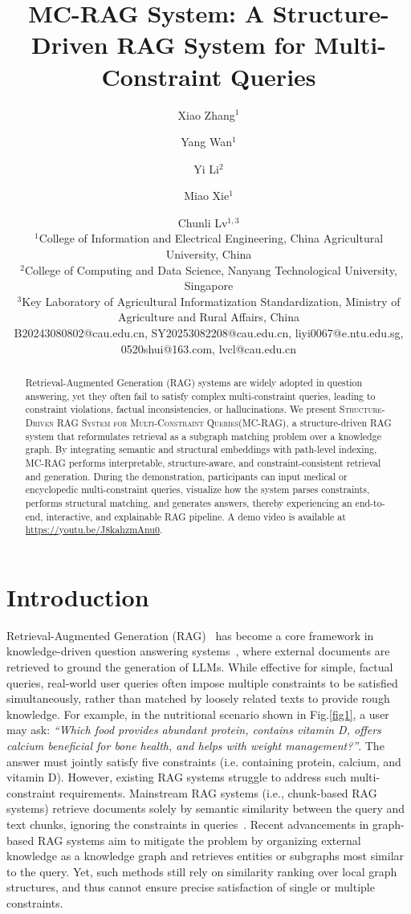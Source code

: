 \documentclass{article}
\title{MC-RAG System: A Structure-Driven RAG System for Multi-Constraint Queries}
\author{
  Xiao Zhang$^1$
  \and
  Yang Wan$^1$
  \and
  Yi Li$^2$
  \and
  Miao Xie$^1$
  \and
  Chunli Lv$^{1,3}$\\
  \affiliations
  $^1$College of Information and Electrical Engineering, China Agricultural University, China\\
  $^2$College of Computing and Data Science, Nanyang Technological University, Singapore\\
  $^3$Key Laboratory of Agricultural Informatization Standardization, Ministry of Agriculture and Rural Affairs, China\\
  \emails
  B20243080802@cau.edu.cn,
  SY20253082208@cau.edu.cn,
  liyi0067@e.ntu.edu.sg,
  0520shui@163.com,
  lvcl@cau.edu.cn
}
\begin{document}
\maketitle

\begin{abstract}
Retrieval-Augmented Generation (RAG) systems are widely adopted in question answering, yet they often fail to satisfy complex multi-constraint queries, leading to constraint violations, factual inconsistencies, or hallucinations.
We present \textsc{ Structure-Driven RAG System for Multi-Constraint Queries(MC-RAG)}, 
a structure-driven RAG system that reformulates retrieval as a subgraph matching problem over a knowledge graph. By integrating semantic and structural embeddings with path-level indexing, \textsc{MC-RAG} performs interpretable, structure-aware, and constraint-consistent retrieval and generation. 
During the demonstration, participants can input medical or encyclopedic multi-constraint queries, visualize how the system parses constraints, performs structural matching, and generates answers, thereby experiencing an end-to-end, interactive, and explainable RAG pipeline. 
A demo video is available at \url{https://youtu.be/J8kahzmAnu0}.
\end{abstract}

\section{Introduction}
Retrieval-Augmented Generation (RAG)~\cite{b1} has become a core framework in knowledge-driven question answering systems~\cite{izacard2021leveraging,borgeaud2022improving}, where external documents are retrieved to ground the generation of LLMs. While effective for simple, factual queries, real-world user queries often impose multiple constraints to be satisfied simultaneously, rather than matched by loosely related texts to provide rough knowledge. For example, in the nutritional scenario shown in Fig.\ref{fig1}, a user may ask:
\textit{``Which food provides abundant protein, contains vitamin D, offers calcium beneficial for bone health, and helps with weight management?''}. The answer must jointly satisfy five constraints (i.e.
containing protein, calcium, and vitamin D). However, existing RAG systems struggle to address such multi-constraint requirements. Mainstream RAG systems (i.e., chunk-based RAG systems\cite{b2}) retrieve documents solely by semantic similarity between the query and text chunks, ignoring the constraints in queries~\cite{karpukhin2020dense,xu2024unsupervised,khattab2020colbert}. Recent advancements in graph-based RAG systems\cite{b3,b7,b10,he2024g} aim to mitigate the problem by organizing external knowledge as a knowledge graph and retrieves entities or subgraphs most similar to the query. Yet, such methods still rely on similarity ranking over local graph structures, and thus cannot ensure precise satisfaction of single or multiple constraints.
\end{document}
